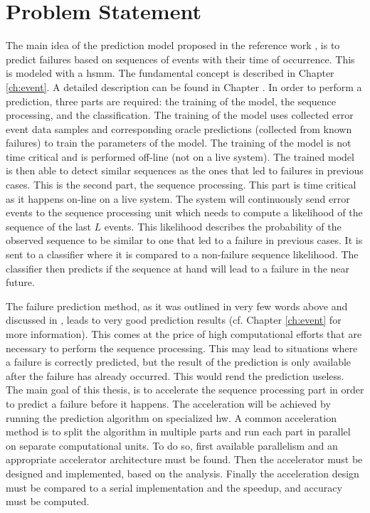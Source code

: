 \documentclass[mscthesis]{usiinfthesis}
\begin{document}
\section{Problem Statement}
\label{ch:_intro_prob}

The main idea of the prediction model proposed in the reference work
\cite{salfner08}, is to predict failures based on sequences of events with
their time of occurrence. This is modeled with a \gls{hsmm}. The fundamental
concept is described in Chapter \ref{ch:event}. A detailed description can be
found in Chapter \cite{salfner08}. In order to perform a prediction, three
parts are required: the training of the model, the sequence processing, and the
classification. The training of the model uses collected error event data
samples and corresponding oracle predictions (collected from known failures) to
train the parameters of the model. The training of the model is not time
critical and is performed off-line (not on a live system). The trained model is
then able to detect similar sequences as the ones that led to failures in
previous cases. This is the second part, the sequence processing. This part is
time critical as it happens on-line on a live system. The system will
continuously send error events to the sequence processing unit which needs to
compute a likelihood of the sequence of the last $L$ events. This likelihood
describes the probability of the observed sequence to be similar to one that
led to a failure in previous cases. It is sent to a classifier where it is
compared to a non-failure sequence likelihood. The classifier then predicts if
the sequence at hand will lead to a failure in the near future.

The failure prediction method, as it was outlined in very few words above and
discussed in \cite{salfner08}, leads to very good prediction results (cf.
Chapter \ref{ch:event} for more information). This comes at the price of high
computational efforts that are necessary to perform the sequence processing.
This may lead to situations where a failure is correctly predicted, but the
result of the prediction is only available after the failure has already
occurred. This would rend the prediction useless. The main goal of this thesis,
is to accelerate the sequence processing part in order to predict a failure
before it happens. The acceleration will be achieved by running the prediction
algorithm on specialized \gls{hw}. A common acceleration method is to split
the algorithm in multiple parts and run each part in parallel on separate
computational units. To do so, first available parallelism and an appropriate
accelerator architecture must be found. Then the accelerator must be designed
and implemented, based on the analysis. Finally the acceleration design must
be compared to a serial implementation and the speedup, and accuracy must be
computed.
\end{document}

